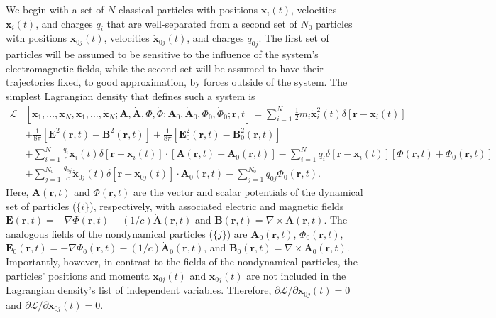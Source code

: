 \documentclass{article}
\begin{document}
We begin with a set of $N$ classical particles with positions $\mathbf{x}_i(t)$, velocities $\dot{\mathbf{x}}_i(t)$, and charges $q_i$ that are well-separated from a second set of $N_0$ particles with positions $\mathbf{x}_{0j}(t)$, velocities $\dot{\mathbf{x}}_{0j}(t)$, and charges $q_{0j}$. The first set of particles will be assumed to be sensitive to the influence of the system's electromagnetic fields, while the second set will be assumed to have their trajectories fixed, to good approximation, by forces outside of the system. The simplest Lagrangian density that defines such a system is
\begin{equation}
\begin{split}
\mathcal{L}&\left[\mathbf{x}_1,\ldots,\mathbf{x}_N,\dot{\mathbf{x}}_1,\ldots,\dot{\mathbf{x}}_N;\mathbf{A},\dot{\mathbf{A}},\Phi,\dot{\Phi};\mathbf{A}_0,\dot{\mathbf{A}}_0,\Phi_0,\dot{\Phi}_0;\mathbf{r},t\right] = \sum_{i = 1}^N\frac{1}{2}m_i\dot{\mathbf{x}}_i^2(t)\delta[\mathbf{r} - \mathbf{x}_i(t)]\\
& + \frac{1}{8\pi}\left[\mathbf{E}^2(\mathbf{r},t) - \mathbf{B}^2(\mathbf{r},t)\right] + \frac{1}{8\pi}\left[\mathbf{E}_0^2(\mathbf{r},t) - \mathbf{B}_0^2(\mathbf{r},t)\right]\\
&+ \sum_{i = 1}^N\frac{q_i}{c}\dot{\mathbf{x}}_i(t)\delta[\mathbf{r} - \mathbf{x}_i(t)]\cdot\left[\mathbf{A}(\mathbf{r},t) + \mathbf{A}_0(\mathbf{r},t)\right] - \sum_{i = 1}^Nq_i\delta[\mathbf{r} - \mathbf{x}_i(t)]\left[\Phi(\mathbf{r},t) + \Phi_0(\mathbf{r},t)\right]\\
&+\sum_{j = 1}^{N_0}\frac{q_{0j}}{c}\dot{\mathbf{x}}_{0j}(t)\delta[\mathbf{r} - \mathbf{x}_{0j}(t)]\cdot\mathbf{A}_0(\mathbf{r},t) - \sum_{j = 1}^{N_0}q_{0j}\Phi_0(\mathbf{r},t).
\end{split}
\end{equation}
Here, $\mathbf{A}(\mathbf{r},t)$ and $\Phi(\mathbf{r},t)$ are the vector and scalar potentials of the dynamical set of particles ($\{i\}$), respectively, with associated electric and magnetic fields $\mathbf{E}(\mathbf{r},t) = -\nabla\Phi(\mathbf{r},t) - (1/c)\dot{\mathbf{A}}(\mathbf{r},t)$ and $\mathbf{B}(\mathbf{r},t) = \nabla\times\mathbf{A}(\mathbf{r},t)$. The analogous fields of the nondynamical particles ($\{j\}$) are $\mathbf{A}_0(\mathbf{r},t)$, $\Phi_0(\mathbf{r},t)$, $\mathbf{E}_0(\mathbf{r},t) = -\nabla\Phi_0(\mathbf{r},t) - (1/c)\dot{\mathbf{A}}_0(\mathbf{r},t)$, and $\mathbf{B}_0(\mathbf{r},t) = \nabla\times\mathbf{A}_0(\mathbf{r},t)$. Importantly, however, in contrast to the fields of the nondynamical particles, the particles' positions and momenta $\mathbf{x}_{0j}(t)$ and $\dot{\mathbf{x}}_{0j}(t)$ are not included in the Lagrangian density's list of independent variables. Therefore, $\partial\mathcal{L}/\partial\mathbf{x}_{0j}(t) = 0$ and $\partial\mathcal{L}/\partial\dot{\mathbf{x}}_{0j}(t) = 0$.
\end{document}
